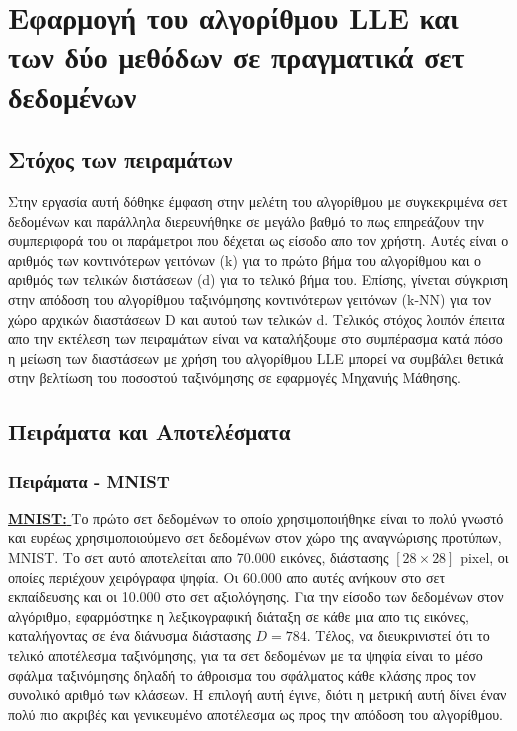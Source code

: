 \chapter{Εφαρμογή του αλγορίθμου \textlatin{LLE} και των δύο μεθόδων σε πραγματικά σετ δεδομένων}
\section{Στόχος των πειραμάτων}
\par
Στην εργασία αυτή δόθηκε έμφαση στην μελέτη του αλγορίθμου με συγκεκριμένα σετ δεδομένων και παράλληλα διερευνήθηκε σε μεγάλο βαθμό το πως επηρεάζουν την συμπεριφορά του οι παράμετροι που δέχεται ως είσοδο απο τον χρήστη. Αυτές είναι ο αριθμός των κοντινότερων γειτόνων \textlatin{(k)} για το πρώτο βήμα του αλγορίθμου και ο αριθμός των τελικών διστάσεων \textlatin{(d)} για το τελικό βήμα του. Επίσης, γίνεται σύγκριση στην απόδοση του αλγορίθμου ταξινόμησης κοντινότερων γειτόνων \textlatin{(k-NN)} για τον χώρο αρχικών διαστάσεων \textlatin{D} και αυτού των τελικών \textlatin{d}. Τελικός στόχος λοιπόν έπειτα απο την εκτέλεση των πειραμάτων είναι να καταλήξουμε στο συμπέρασμα κατά πόσο η μείωση των διαστάσεων με χρήση του αλγορίθμου \textlatin{LLE} μπορεί να συμβάλει θετικά στην βελτίωση του ποσοστού ταξινόμησης σε εφαρμογές Μηχανιής
Μάθησης.

\section{Πειράματα και Αποτελέσματα}

\subsection{Πειράματα - \textlatin{MNIST}}
\par
\href{http://yann.lecun.com/exdb/mnist/}{\textbf{\textlatin{MNIST: }}}Το πρώτο σετ δεδομένων το οποίο χρησιμοποιήθηκε είναι το πολύ γνωστό και ευρέως χρησιμοποιούμενο σετ δεδομένων στον χώρο της αναγνώρισης προτύπων, \textlatin{MNIST}\textlatin{\cite{mnist}}. Το σετ αυτό αποτελείται απο 70.000 εικόνες, διάστασης $[28 \times 28]$ \textlatin{pixel}, οι οποίες περιέχουν χειρόγραφα ψηφία. Οι 60.000 απο αυτές ανήκουν στο σετ εκπαίδευσης και οι 10.000 στο σετ αξιολόγησης. Για την είσοδο των δεδομένων στον αλγόριθμο, εφαρμόστηκε η λεξικογραφική διάταξη σε κάθε μια απο τις εικόνες, καταλήγοντας σε ένα διάνυσμα διάστασης $D = 784$. Τέλος, να διευκρινιστεί ότι το τελικό αποτέλεσμα ταξινόμησης, για τα σετ δεδομένων με τα ψηφία είναι το μέσο σφάλμα ταξινόμησης δηλαδή το άθροισμα του σφάλματος κάθε κλάσης προς τον συνολικό αριθμό των κλάσεων. Η επιλογή αυτή έγινε, διότι η μετρική αυτή δίνει έναν πολύ πιο ακριβές και γενικευμένο αποτέλεσμα ως προς την απόδοση του αλγορίθμου.

